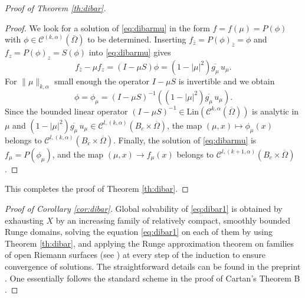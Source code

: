 \documentclass[11pt]{amsart}
\numberwithin{equation}{section}
\theoremstyle{definition}
\newcommand\Cscr{\mathscr{C}}
\begin{document}
\begin{proof}[Proof of Theorem \ref{th:dibar}]
\begin{proof}
We look for a solution of \eqref{eq:dibarmu} in the form $f=f(\mu)=P(\phi)$ with 
$\phi\in \Cscr^{(k,\alpha)}(\overline\Omega)$ to be determined. 
Inserting $f_{\bar z}=P(\phi)_{\bar z}=\phi$ and $f_{z}=P(\phi)_z=S(\phi)$
into \eqref{eq:dibarmu} gives
\[
	f_{\bar z}-\mu f_z = (I-\mu S)\phi = 
	(1-|\mu|^2) \overline{g_\mu} \, u_\mu.
\]
For $\|\mu\|_{k,\alpha}$ small enough the operator $I-\mu S$ is
invertible and we obtain 
\[
	\phi=\phi_\mu = 
	(I-\mu S)^{-1}\left((1-|\mu|^2) \overline{g_\mu} \, u_\mu \right).
\] 
Since the bounded linear operator 
$(I-\mu S)^{-1}\in \mathrm{Lin}(\Cscr^{k,\alpha}(\overline \Omega))$
is analytic in $\mu$ and $(1-|\mu|^2) \overline{g_\mu} \, u_\mu 
\in \Cscr^{l,(k,\alpha)}(B_c\times\overline \Omega)$, the map
$(\mu,x)\mapsto \phi_\mu(x)$ belongs to
$\Cscr^{l,(k,\alpha)}(B_c\times\overline \Omega)$.
Finally, the solution of \eqref{eq:dibarmu} is $f_\mu = P(\phi_\mu)$,  
and the map $(\mu,x)\to f_\mu(x)$ belongs to
$\Cscr^{l,(k+1,\alpha)}(B_c\times \overline \Omega)$. 
\end{proof}

This completes the proof of Theorem \ref{th:dibar}. 
\end{proof}


\begin{proof}[Proof of Corollary \ref{cor:dibar}]
Global solvability of \eqref{eq:dibar1} is 
obtained by exhausting $X$ by an increasing family 
of relatively compact, smoothly bounded Runge domains, solving the 
equation \eqref{eq:dibar1} on each of them by using
Theorem \ref{th:dibar}, and applying the Runge 
approximation theorem on families of open Riemann
surfaces (see \cite[Theorem 1.1]{Forstneric2024Runge})  
at every step of the induction to ensure convergence of solutions. 
The straightforward details can be found in the preprint 
\cite[V3, proof of Theorem 9.1]{Forstneric2024Runge}.
One essentially follows the standard scheme in the proof of 
Cartan's Theorem B \cite[Section VIII.14]{GunningRossi1965}.
\end{proof}
\end{document}
